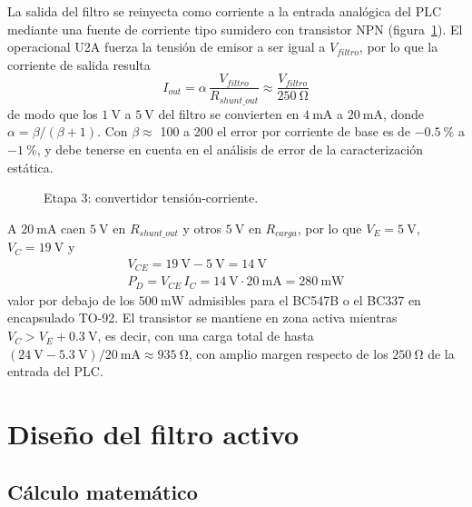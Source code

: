 La salida del filtro se reinyecta como corriente a la entrada analógica del PLC mediante una fuente de corriente tipo
sumidero con transistor NPN (figura~\ref{crkt:etapa3}). El operacional U2A fuerza la tensión de emisor a ser igual a
$V_{filtro}$, por lo que la corriente de salida resulta
\begin{equation}
  I_{out} = \alpha \, \frac{V_{filtro}}{R_{shunt\_out}} \approx \frac{V_{filtro}}{\SI{250}{\ohm}}
  \label{eq:iout}
\end{equation}
de modo que los $\SI{1}{\volt}$ a $\SI{5}{\volt}$ del filtro se convierten en $\SI{4}{\milli\ampere}$ a
$\SI{20}{\milli\ampere}$, donde $\alpha = \beta / (\beta + 1)$. Con $\beta \approx$ 100 a 200 el error por
corriente de base es de $\SI{-0.5}{\percent}$ a $\SI{-1}{\percent}$, y debe tenerse en cuenta en el análisis de
error de la caracterización estática.

\begin{figure}[H]
  \centering
  
  \caption{Etapa 3: convertidor tensión-corriente.}
  \label{crkt:etapa3}
\end{figure}

A $\SI{20}{\milli\ampere}$ caen $\SI{5}{\volt}$ en $R_{shunt\_out}$ y otros $\SI{5}{\volt}$ en $R_{carga}$, por lo
que $V_E = \SI{5}{\volt}$, $V_C = \SI{19}{\volt}$ y
\begin{gather*}
  V_{CE} = \SI{19}{\volt} - \SI{5}{\volt} = \SI{14}{\volt} \\
  P_D = V_{CE} \, I_C = \SI{14}{\volt} \cdot \SI{20}{\milli\ampere} = \SI{280}{\milli\watt}
\end{gather*}
valor por debajo de los $\SI{500}{\milli\watt}$ admisibles para el BC547B o el BC337 en encapsulado TO-92. El
transistor se mantiene en zona activa mientras $V_C > V_E + \SI{0.3}{\volt}$, es decir, con una carga total de
hasta $(\SI{24}{\volt} - \SI{5.3}{\volt}) / \SI{20}{\milli\ampere} \approx \SI{935}{\ohm}$, con amplio margen
respecto de los $\SI{250}{\ohm}$ de la entrada del PLC.

\section{Diseño del filtro activo}
\label{sec:campo-diseno}

\subsection{Cálculo matemático}
\label{subsec:campo-calculo}

